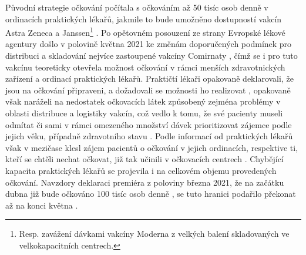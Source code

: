 
Původní strategie očkování počítala s očkováním až 50 tisíc osob denně v ordinacích praktických lékařů, jakmile to bude umožněno dostupností vakcín Astra Zeneca a Janssen\footnote{Resp. zavážení dávkami vakcíny Moderna z velkých balení skladovaných ve velkokapacitních centrech.} \cite{strategie_covid}. Po opětovném posouzení ze strany Evropské lékové agentury došlo v polovině května 2021 ke změnám doporučených podmínek pro distribuci a skladování nejvíce zastoupené vakcíny Comirnaty \cite{logoc_pfizer_mrazak}, čímž se i pro tuto vakcínu teoreticky otevřela možnost očkování v rámci menších zdravotnických zařízení a ordinací praktických lékařů. %
Praktičtí lékaři opakovaně deklarovali, že jsou na očkování připraveni, a dožadovali se možnosti ho realizovat \cite{logoc_svl,logoc_pripravenost}, opakovaně však naráželi na nedostatek očkovacích látek způsobený zejména problémy v oblasti distribuce a logistiky vakcín, což vedlo k tomu, že své pacienty museli odmítat či sami v rámci omezeného množství dávek prioritizovat zájemce podle jejich věku, případně zdravotního stavu \cite{logo_logistika}. 
%
Podle informací od praktických lékařů však v mezičase klesl zájem pacientů o očkování v jejich ordinacích, respektive ti, kteří se chtěli nechat očkovat, již tak učinili v očkovacích centrech \cite{logo_praktici}. 
%
Chybějící kapacita praktických lékařů se projevila i na celkovém objemu provedených očkování. Navzdory deklaraci premiéra z poloviny března 2021, že na začátku dubna již bude očkováno 100 tisíc osob denně \cite{logoc_100k}, se tuto hranici podařilo překonat až na konci května \cite{logoc_100kmame}. %




